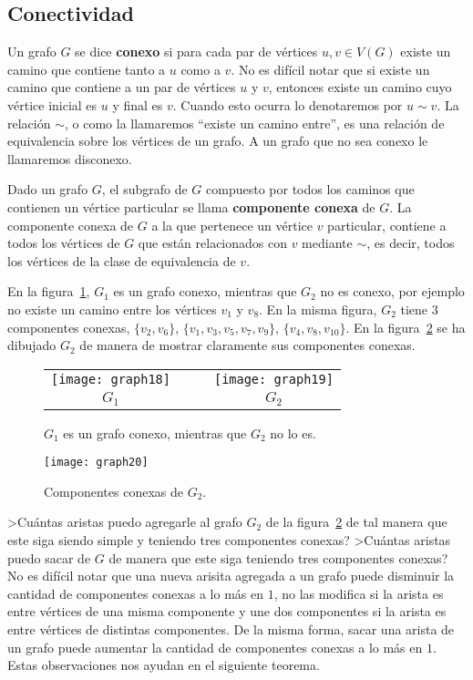 \subsection{Conectividad}
\begin{definicion}
Un grafo $G$ se dice {\bf conexo} si para cada par de vértices $u,v\in V(G)$ existe un camino que contiene tanto a $u$ como a $v$.
No es difícil notar que si existe un camino que contiene a un par de vértices $u$ y $v$, entonces existe un camino cuyo vértice inicial es $u$ y final es $v$.
Cuando esto ocurra lo denotaremos por $u\sim v$.
La relación $\sim$, o como la llamaremos ``existe un camino entre'', es una relación de equivalencia sobre los vértices de un grafo.
A un grafo que no sea conexo le llamaremos disconexo.

Dado un grafo $G$, el subgrafo de $G$ compuesto por todos los caminos que contienen un vértice particular se llama {\bf componente conexa} de $G$.
La componente conexa de $G$ a la que pertenece un vértice $v$ particular, contiene a todos los vértices de $G$ que están relacionados con $v$ mediante $\sim$, es decir, todos los vértices de la clase de equivalencia de $v$.
\end{definicion}

\begin{ejemplo}
En la figura~\ref{fig:conex}, $G_1$ es un grafo conexo, mientras que $G_2$ no es conexo, por ejemplo no existe un camino entre los vértices $v_1$ y $v_8$.
En la misma figura, $G_2$ tiene $3$ componentes conexas, $\{v_2,v_6\}$, $\{v_1,v_3,v_5,v_7,v_9\}$, $\{v_4,v_8,v_{10}\}$.
En la figura~\ref{fig:conex-components} se ha dibujado $G_2$ de manera de mostrar claramente sus componentes conexas.
\begin{figure}[h!]
\centering
\begin{tabular}{cccc}
\texttt{[image: graph18]} & & & \texttt{[image: graph19]} \\
$G_1$ & & & $G_2$
\end{tabular}
\caption{$G_1$ es un grafo conexo, mientras que $G_2$ no lo es.}
\label{fig:conex}
\end{figure}
\begin{figure}[h!]
\centering
\texttt{[image: graph20]}
\caption{Componentes conexas de $G_2$.}
\label{fig:conex-components}
\end{figure}
\end{ejemplo}

>Cuántas aristas puedo agregarle al grafo $G_2$ de la figura~\ref{fig:conex-components} de tal manera que este siga siendo simple y teniendo tres componentes conexas?
>Cuántas aristas puedo sacar de $G$ de manera que este siga teniendo tres componentes conexas?
No es difícil notar que una nueva arisita agregada a un grafo puede disminuir la cantidad de componentes conexas a lo más en $1$, no las modifica si la arista es entre vértices de una misma componente y une dos componentes si la arista es entre vértices de distintas componentes.
De la misma forma, sacar una arista de un grafo puede aumentar la cantidad de componentes conexas a lo más en $1$.
Estas observaciones nos ayudan en el siguiente teorema.

